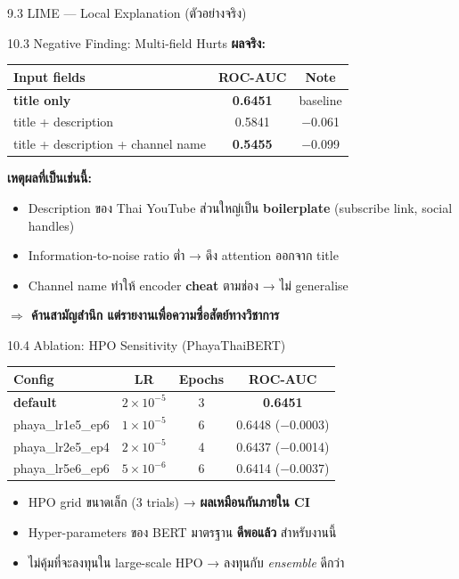 \documentclass[aspectratio=169,11pt,xcolor=dvipsnames]{beamer}
\newcommand{\hl}[1]{\textcolor{kmitlOrange}{\textbf{#1}}}
\begin{document}
\begin{frame}{9.3 LIME — Local Explanation (ตัวอย่างจริง)}
\begin{center}
\begin{frame}{10.3 Negative Finding: Multi-field Hurts}
  \textbf{ผลจริง:}
  \begin{center}
    \begin{tabular}{lcc}
      \toprule
      \textbf{Input fields} & \textbf{ROC-AUC} & \textbf{Note}\\
      \midrule
      \hl{title only} & \textbf{0.6451} & baseline\\
      title + description & 0.5841 & $-$0.061\\
      title + description + channel name & \hl{0.5455} & $-$0.099\\
      \bottomrule
    \end{tabular}
  \end{center}
  \vspace{0.4em}
  \textbf{เหตุผลที่เป็นเช่นนี้:}
  \begin{itemize}
    \item Description ของ Thai YouTube ส่วนใหญ่เป็น \hl{boilerplate} (subscribe link, social handles)
    \item Information-to-noise ratio ต่ำ → ดึง attention ออกจาก title
    \item Channel name ทำให้ encoder \hl{cheat} ตามช่อง → ไม่ generalise
  \end{itemize}
  \begin{center}
    \scriptsize \hl{$\Rightarrow$ ค้านสามัญสำนึก แต่รายงานเพื่อความซื่อสัตย์ทางวิชาการ}
  \end{center}
\end{frame}

\begin{frame}{10.4 Ablation: HPO Sensitivity (PhayaThaiBERT)}
  \begin{center}
    \begin{tabular}{lccc}
      \toprule
      \textbf{Config} & \textbf{LR} & \textbf{Epochs} & \textbf{ROC-AUC}\\
      \midrule
      \hl{default} & $2 \times 10^{-5}$ & 3 & \textbf{0.6451}\\
      phaya\_lr1e5\_ep6 & $1 \times 10^{-5}$ & 6 & 0.6448 ($-$0.0003)\\
      phaya\_lr2e5\_ep4 & $2 \times 10^{-5}$ & 4 & 0.6437 ($-$0.0014)\\
      phaya\_lr5e6\_ep6 & $5 \times 10^{-6}$ & 6 & 0.6414 ($-$0.0037)\\
      \bottomrule
    \end{tabular}
  \end{center}
  \vspace{0.4em}
  \begin{itemize}
    \item HPO grid ขนาดเล็ก (3 trials) → \hl{ผลเหมือนกันภายใน CI}
    \item Hyper-parameters ของ BERT มาตรฐาน \hl{ดีพอแล้ว} สำหรับงานนี้
    \item ไม่คุ้มที่จะลงทุนใน large-scale HPO → ลงทุนกับ \emph{ensemble} ดีกว่า
  \end{itemize}
\end{frame}


\end{center}
\end{frame}
\end{document}
